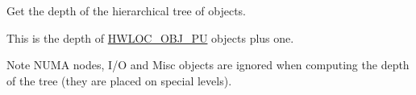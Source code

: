 Get the depth of the hierarchical tree of objects. 

This is the depth of \hyperlink{a00184_ggacd37bb612667dc437d66bfb175a8dc55abca6887e80cb291353b0a0c1da83f661}{H\+W\+L\+O\+C\+\_\+\+O\+B\+J\+\_\+\+PU} objects plus one.

\begin{DoxyNote}{Note}
N\+U\+MA nodes, I/O and Misc objects are ignored when computing the depth of the tree (they are placed on special levels). 
\end{DoxyNote}
